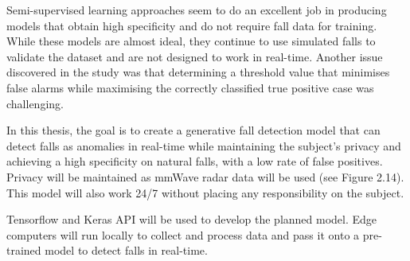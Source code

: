 Semi-supervised learning approaches seem to do an excellent job in producing models that obtain high specificity and do not require fall data for training. While these models are almost ideal, they continue to use simulated falls to validate the dataset and are not designed to work in real-time. Another issue discovered in the study was that determining a threshold value that minimises false alarms while maximising the correctly classified true positive case was challenging. 

In this thesis, the goal is to create a generative fall detection model that can detect falls as anomalies in real-time while maintaining the subject's privacy and achieving a high specificity on natural falls, with a low rate of false positives. Privacy will be maintained as mmWave radar data will be used (see Figure 2.14). This model will also work 24/7 without placing any responsibility on the subject.

Tensorflow and Keras API will be used to develop the planned model. Edge computers will run locally to collect and process data and pass it onto a pre-trained model to detect falls in real-time.